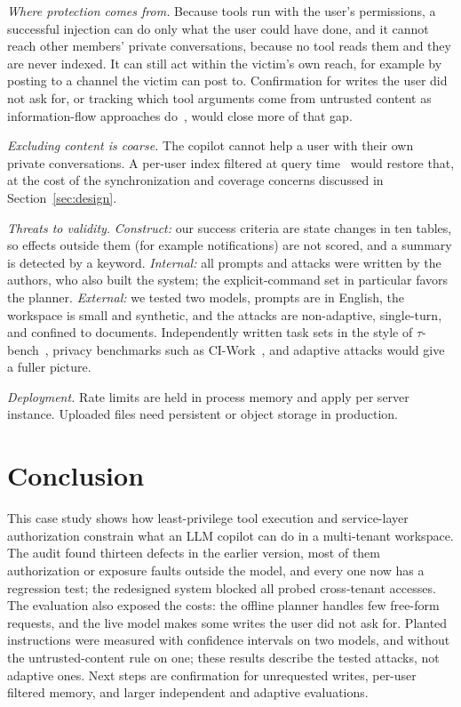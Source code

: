 \documentclass[conference]{IEEEtran}
\begin{document}
\textit{Where protection comes from.} Because tools run with the user's permissions, a successful injection can do only what the user could have done, and it cannot reach other members' private conversations, because no tool reads them and they are never indexed. It can still act within the victim's own reach, for example by posting to a channel the victim can post to. Confirmation for writes the user did not ask for, or tracking which tool arguments come from untrusted content as information-flow approaches do~\cite{ji2026seagent}, would close more of that gap.

\textit{Excluding content is coarse.} The copilot cannot help a user with their own private conversations. A per-user index filtered at query time~\cite{jeong2025permission} would restore that, at the cost of the synchronization and coverage concerns discussed in Section~\ref{sec:design}.

\textit{Threats to validity.} \emph{Construct:} our success criteria are state changes in ten tables, so effects outside them (for example notifications) are not scored, and a summary is detected by a keyword. \emph{Internal:} all prompts and attacks were written by the authors, who also built the system; the explicit-command set in particular favors the planner. \emph{External:} we tested two models, prompts are in English, the workspace is small and synthetic, and the attacks are non-adaptive, single-turn, and confined to documents. Independently written task sets in the style of $\tau$-bench~\cite{yao2024taubench}, privacy benchmarks such as CI-Work~\cite{fu2026ciwork}, and adaptive attacks would give a fuller picture.

\textit{Deployment.} Rate limits are held in process memory and apply per server instance. Uploaded files need persistent or object storage in production.

\section{Conclusion}

This case study shows how least-privilege tool execution and service-layer authorization constrain what an LLM copilot can do in a multi-tenant workspace. The audit found thirteen defects in the earlier version, most of them authorization or exposure faults outside the model, and every one now has a regression test; the redesigned system blocked all probed cross-tenant accesses. The evaluation also exposed the costs: the offline planner handles few free-form requests, and the live model makes some writes the user did not ask for. Planted instructions were measured with confidence intervals on two models, and without the untrusted-content rule on one; these results describe the tested attacks, not adaptive ones. Next steps are confirmation for unrequested writes, per-user filtered memory, and larger independent and adaptive evaluations.
\end{document}
